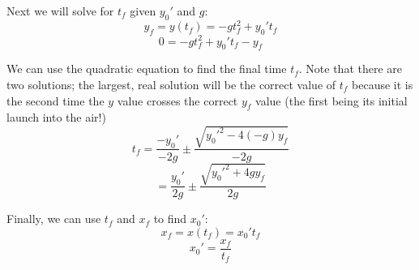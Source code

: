 \documentclass[12pt]{article}
\begin{document}
Next we will solve for $t_f$ given $y_0'$ and $g$:
\[ y_f = y(t_f) = -gt_f^2 + y_0't_f \]
\[ 0 = -gt_f^2 + y_0't_f - y_f \]

We can use the quadratic equation to find the final time $t_f$. Note that there are two solutions; the largest, real solution will be the correct value of $t_f$ because it is the second time the $y$ value crosses the correct $y_f$ value (the first being its initial launch into the air!)
\[ t_f = \frac{-y_0'}{-2g} \pm \frac{\sqrt{ y_0'^2 - 4(-g)y_f }}{-2g} \]
\[ = \frac{y_0'}{2g} \pm \frac{\sqrt{ y_0'^2 + 4gy_f }}{2g} \]

Finally, we can use $t_f$ and $x_f$ to find $x_0'$:
\[ x_f = x(t_f) = x_0't_f \]
\[ x_0' = \frac{x_f}{t_f} \]

\end{document}
